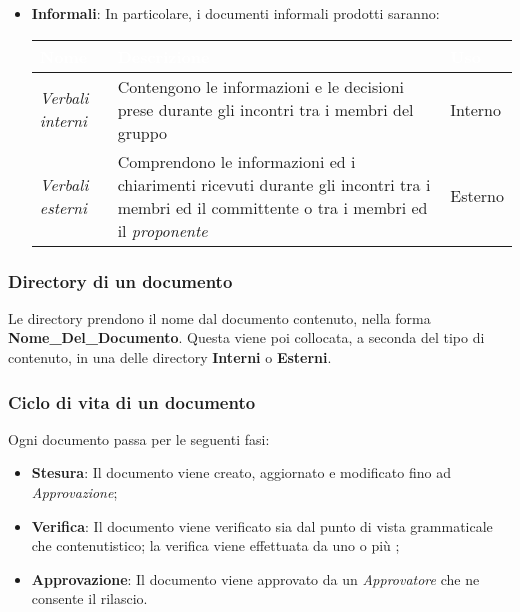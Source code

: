 \begin{itemize}
{			}
			\item \textbf{Informali}: 
			In particolare, i documenti informali prodotti saranno:
			{
				\setlength{\freewidth}{\dimexpr\textwidth-1\tabcolsep}
				\renewcommand{\arraystretch}{1.5}
				\centering
				\setlength{\aboverulesep}{0pt}
				\setlength{\belowrulesep}{0pt}
				\begin{longtable}{C{.24\freewidth} C{.58\freewidth} C{.12\freewidth}}
					\toprule
					\textcolor{white}{\textbf{Nome}}&
					\textcolor{white}{\textbf{Descrizione}}&
					\textcolor{white}{\textbf{Uso}}\\	
					\toprule
					\endhead
					\emph{Verbali interni} & Contengono le informazioni e le decisioni prese durante gli incontri tra i membri del gruppo & Interno \\	
					\emph{Verbali esterni} & Comprendono le informazioni ed i chiarimenti ricevuti durante gli incontri tra i membri ed il committente o tra i membri ed il \emph{proponente} & Esterno \\
					\bottomrule
				\end{longtable}
			}
		\end{itemize}
	
	\subsubsection{Directory di un documento}
	Le directory prendono il nome dal documento contenuto, nella forma \textbf{Nome\_Del\_Documento}. Questa viene poi collocata, a seconda del tipo di contenuto, in una delle directory \textbf{Interni} o \textbf{Esterni}. 
	
	\subsubsection{Ciclo di vita di un documento}
		Ogni documento passa per le seguenti fasi:
			\begin{itemize}
				\item \textbf{Stesura}: Il documento viene creato, aggiornato e modificato fino ad \emph{Approvazione};
				\item  \textbf{Verifica}: Il documento viene verificato sia dal punto di vista grammaticale che contenutistico; la verifica viene effettuata da uno o più \verf{};
				\item \textbf{Approvazione}: Il documento viene approvato da un \emph{Approvatore} che ne consente il rilascio.
			\end{itemize}
